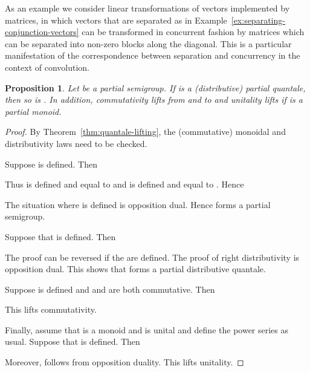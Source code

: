 \documentclass[12pt]{article}
\newtheorem{proposition}{Proposition}
\theoremstyle{definition}
\begin{document}
As an example we consider linear transformations of vectors
implemented by matrices, in which vectors that are separated as in
Example~\ref{ex:separating-conjunction-vectors} can be transformed in
concurrent fashion by matrices which can be separated into non-zero
blocks along the diagonal.  This is a particular manifestation of the
correspondence between separation and concurrency in the context of
convolution.
\begin{proposition}\label{prop:partial-quantale-lifting}
  Let  be a partial semigroup. If  is a
  (distributive) partial quantale, then so is
  . In addition, commutativity lifts
  from  and  to  and unitality lifts if  is a partial
  monoid.
\end{proposition}
\begin{proof}
  By Theorem~\ref{thm:quantale-lifting}, the (commutative) monoidal
  and distributivity laws need to be checked.

  Suppose  is defined. Then

Thus  is defined and equal to  and  is defined and
equal to . Hence

The situation where  is defined is
opposition dual. Hence  forms a partial semigroup. 

Suppose that  is defined. Then

The proof can be reversed if the   are
defined. The proof of right distributivity is opposition dual.  This
shows that  forms a partial distributive quantale.

Suppose  is defined and  and  are both
commutative. Then

This lifts commutativity.

Finally, assume that  is a monoid and  is unital and define the
power series  as usual. Suppose that  is
defined. Then

Moreover,  follows from opposition duality. This lifts
unitality.
\end{proof}
\end{document}
